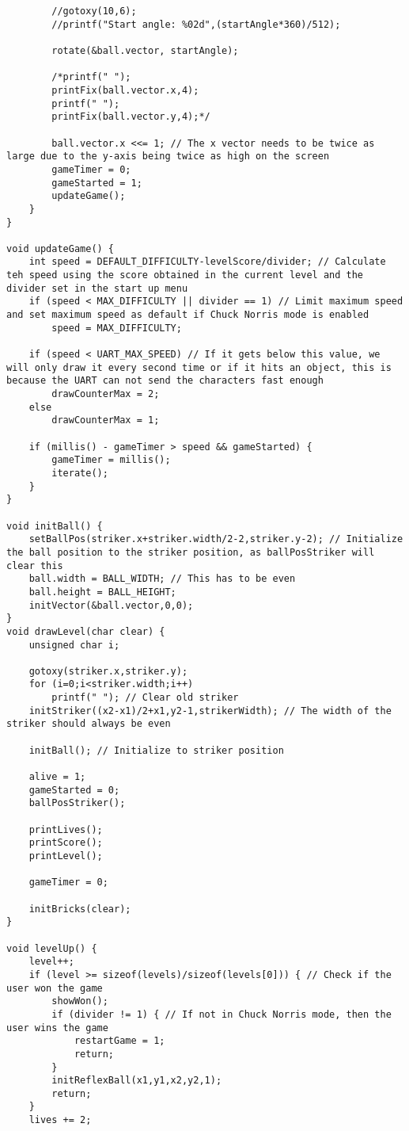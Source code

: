 \begin{lstlisting}
		//gotoxy(10,6);
		//printf("Start angle: %02d",(startAngle*360)/512);
		
		rotate(&ball.vector, startAngle);
		
		/*printf(" ");
		printFix(ball.vector.x,4);
		printf(" ");
		printFix(ball.vector.y,4);*/

		ball.vector.x <<= 1; // The x vector needs to be twice as large due to the y-axis being twice as high on the screen
		gameTimer = 0;
		gameStarted = 1;
		updateGame();
	}
}

void updateGame() {
	int speed = DEFAULT_DIFFICULTY-levelScore/divider; // Calculate teh speed using the score obtained in the current level and the divider set in the start up menu
	if (speed < MAX_DIFFICULTY || divider == 1) // Limit maximum speed and set maximum speed as default if Chuck Norris mode is enabled
		speed = MAX_DIFFICULTY;
		
	if (speed < UART_MAX_SPEED) // If it gets below this value, we will only draw it every second time or if it hits an object, this is because the UART can not send the characters fast enough
		drawCounterMax = 2;
	else
		drawCounterMax = 1;

	if (millis() - gameTimer > speed && gameStarted) {
		gameTimer = millis();
		iterate();
	}
}

void initBall() {
	setBallPos(striker.x+striker.width/2-2,striker.y-2); // Initialize the ball position to the striker position, as ballPosStriker will clear this
	ball.width = BALL_WIDTH; // This has to be even
	ball.height = BALL_HEIGHT;
	initVector(&ball.vector,0,0);
}
void drawLevel(char clear) {
	unsigned char i;

	gotoxy(striker.x,striker.y);
	for (i=0;i<striker.width;i++)
		printf(" "); // Clear old striker
	initStriker((x2-x1)/2+x1,y2-1,strikerWidth); // The width of the striker should always be even

	initBall(); // Initialize to striker position
	
	alive = 1;
	gameStarted = 0;
	ballPosStriker();

	printLives();
	printScore();	
	printLevel();

	gameTimer = 0;

	initBricks(clear);
}

void levelUp() {
	level++;	
	if (level >= sizeof(levels)/sizeof(levels[0])) { // Check if the user won the game
		showWon();
		if (divider != 1) { // If not in Chuck Norris mode, then the user wins the game
			restartGame = 1;
			return;
		}
		initReflexBall(x1,y1,x2,y2,1);
		return;
	}	
	lives += 2;
	

\end{lstlisting}
